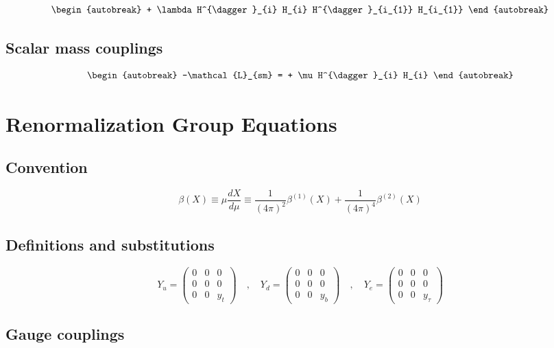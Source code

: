 \documentclass[12pt]{article}
\begin{document}
{{{\begin{align*}
\begin{autobreak}
+ \lambda H^{\dagger}_{i} H_{i} H^{\dagger}_{i_{1}} H_{i_{1}}
\end{autobreak}
\end{align*}
}\subsection{Scalar mass couplings}
{\allowdisplaybreaks
\begin{align*}
\begin{autobreak}
-\mathcal{L}_{sm} = 

+ \mu H^{\dagger}_{i} H_{i}
\end{autobreak}
\end{align*}
}

\section{Renormalization Group Equations}
\subsection{Convention}
\begin{equation*}
\beta\left(X\right) \equiv \mu \frac{d X}{d \mu}\equiv\frac{1}{\left(4 \pi\right)^{2}}\beta^{(1)}(X)+\frac{1}{\left(4 \pi\right)^{4}}\beta^{(2)}(X)
\end{equation*}
\subsection{Definitions and substitutions}
\begin{equation*}
Y_u=\begin{pmatrix}0 & 0 & 0\\0 & 0 & 0\\0 & 0 & y_t\end{pmatrix} \quad,\quad Y_d=\begin{pmatrix}0 & 0 & 0\\0 & 0 & 0\\0 & 0 & y_b\end{pmatrix} \quad,\quad Y_e=\begin{pmatrix}0 & 0 & 0\\0 & 0 & 0\\0 & 0 & y_\tau\end{pmatrix}
\end{equation*}


\subsection{Gauge couplings}
{\allowdisplaybreaks

}}}
\end{document}
